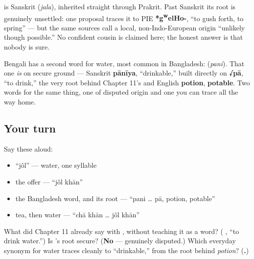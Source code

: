 \begin{cousinweb}
\textbf{} is Sanskrit \textbf{} (\emph{jala}), inherited straight through Prakrit. Past Sanskrit its root is genuinely unsettled: one proposal traces it to PIE \textbf{*g\textsuperscript{w}elHo-}, \textquotedblleft{}to gush forth, to spring\textquotedblright{} — but the same sources call a local, non-Indo-European origin \textquotedblleft{}unlikely though possible.\textquotedblright{} No confident cousin is claimed here; the honest answer is that nobody is sure.

Bengali has a second word for water, most common in Bangladesh: \textbf{} (\emph{pani}). That one \emph{is} on secure ground — Sanskrit \textbf{pānīya}, \textquotedblleft{}drinkable,\textquotedblright{} built directly on \textbf{√pā}, \textquotedblleft{}to drink,\textquotedblright{} the very root behind Chapter 11's \textbf{ } and English \textbf{potion}, \textbf{potable}. Two words for the same thing, one of disputed origin and one you can trace all the way home.
\end{cousinweb}

\subsection*{Your turn}
Say these aloud:

\begin{itemize}
\raggedright
  \item \textquotedblleft{}jôl\textquotedblright{} — water, one syllable
  \item the offer — \textquotedblleft{}jôl khān\textquotedblright{}
  \item the Bangladesh word, and its root — \textquotedblleft{}pani … pā, potion, potable\textquotedblright{}
  \item tea, then water — \textquotedblleft{}chā khān … jôl khān\textquotedblright{}
\end{itemize}

\begin{tcolorbox}[breakable,colback=teal!4,colframe=teal!35!black,title={Before you move on}]
What did Chapter 11 already say with , without teaching it as a word? (\textbf{ }, \textquotedblleft{}to drink water.\textquotedblright{}) Is 's root secure? (\textbf{No} — genuinely disputed.) Which everyday synonym for water traces cleanly to \textquotedblleft{}drinkable,\textquotedblright{} from the root behind \emph{potion}? (\textbf{.})
\end{tcolorbox}

